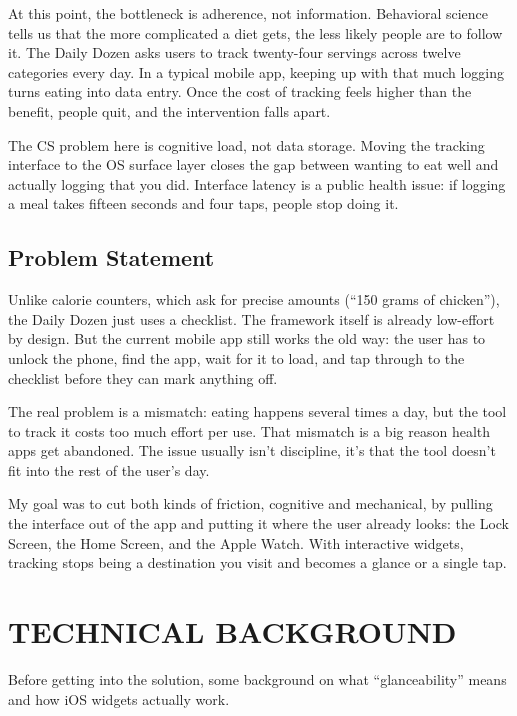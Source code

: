 \documentclass[10pt,twocolumn]{article}
\begin{document}
At this point, the bottleneck is adherence, not information. Behavioral science tells us that the more complicated a diet gets, the less likely people are to follow it. The Daily Dozen asks users to track twenty-four servings across twelve categories every day.\cite{GregerHowNotToDie} In a typical mobile app, keeping up with that much logging turns eating into data entry. Once the cost of tracking feels higher than the benefit, people quit, and the intervention falls apart.

The CS problem here is cognitive load, not data storage. Moving the tracking interface to the OS surface layer closes the gap between wanting to eat well and actually logging that you did. Interface latency is a public health issue: if logging a meal takes fifteen seconds and four taps, people stop doing it.

\subsection{Problem Statement}

Unlike calorie counters, which ask for precise amounts (``150 grams of chicken''), the Daily Dozen just uses a checklist.\cite{GregerHowNotToDie} The framework itself is already low-effort by design. But the current mobile app still works the old way: the user has to unlock the phone, find the app, wait for it to load, and tap through to the checklist before they can mark anything off.

The real problem is a mismatch: eating happens several times a day, but the tool to track it costs too much effort per use.\cite{GregerHowNotToDie} That mismatch is a big reason health apps get abandoned. The issue usually isn't discipline, it's that the tool doesn't fit into the rest of the user's day.

My goal was to cut both kinds of friction, cognitive and mechanical, by pulling the interface out of the app and putting it where the user already looks: the Lock Screen, the Home Screen, and the Apple Watch. With interactive widgets, tracking stops being a destination you visit and becomes a glance or a single tap.

\section{TECHNICAL BACKGROUND}

Before getting into the solution, some background on what ``glanceability'' means and how iOS widgets actually work.
\end{document}

